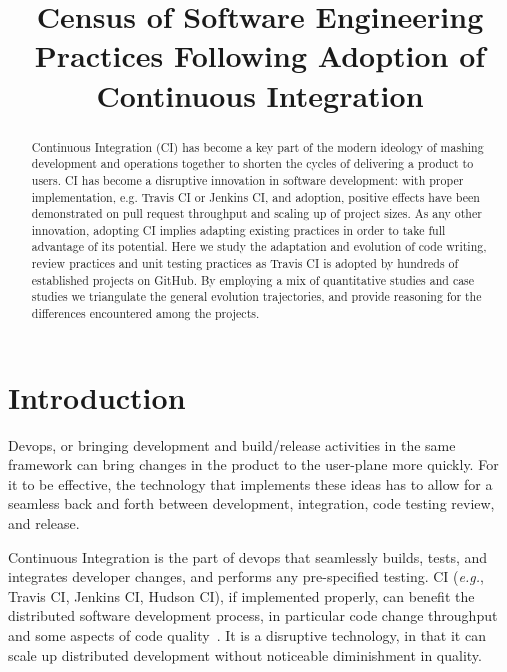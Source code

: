 \documentclass[conference]{IEEEtran}
\newcommand{\eg}{{\emph{e.g.}},\xspace}
\begin{document}
\title{Census of Software Engineering Practices
Following Adoption of Continuous Integration}

\author
{\IEEEauthorblockN{}
\IEEEauthorblockA{}
}
\maketitle
\begin{abstract}
Continuous Integration (CI) has become a key part of the modern ideology of mashing development and operations together to shorten the cycles of delivering a product to users. CI has become a disruptive innovation in software development: with proper implementation, e.g. Travis CI or Jenkins CI, and adoption, positive effects have been demonstrated on pull request throughput and scaling up of project sizes. As any other innovation, adopting CI implies adapting existing practices in order to take full advantage of its potential. Here we study the adaptation and evolution of code writing, review practices and unit testing practices as Travis CI is adopted by hundreds of established projects on GitHub. By employing a mix of quantitative studies and case studies we triangulate the general evolution trajectories, and provide reasoning for the differences encountered among the projects.
\end{abstract}

\section{Introduction}
Devops, or bringing development and build/release activities in the same framework can bring changes in the product to the user-plane more quickly. For it to be effective, the technology that implements these ideas has to allow for a seamless back and forth between development, integration, code testing review, and release. 

Continuous Integration is the part of devops that seamlessly builds, tests, and integrates developer changes, and performs any pre-specified testing. CI (\eg Travis CI, Jenkins CI, Hudson CI), if implemented properly, can benefit the distributed software development process, in particular code change throughput~\cite{Stolberg} and some aspects of code quality~\cite{VasilescuYWDF15}. It is a disruptive technology, in that it can scale up distributed development without noticeable diminishment in quality.
\end{document}
